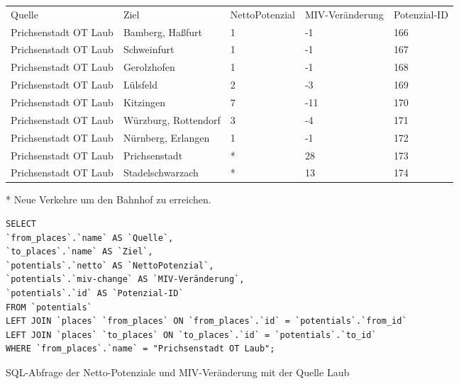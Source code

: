\begin{tabularx}{\textwidth}{*5{X}}
Quelle & Ziel & NettoPotenzial & MIV-Veränderung & Potenzial-ID\\ 
Prichsenstadt OT Laub & Bamberg, Haßfurt & 1 & -1 & 166\\ 
Prichsenstadt OT Laub & Schweinfurt & 1 & -1 & 167\\ 
Prichsenstadt OT Laub & Gerolzhofen & 1 & -1 & 168\\ 
Prichsenstadt OT Laub & Lülsfeld & 2 & -3 & 169\\ 
Prichsenstadt OT Laub & Kitzingen & 7 & -11 & 170\\ 
Prichsenstadt OT Laub & Würzburg, Rottendorf & 3 & -4 & 171\\ 
Prichsenstadt OT Laub & Nürnberg, Erlangen & 1 & -1 & 172\\ 
Prichsenstadt OT Laub & Prichsenstadt & * & 28 & 173\\ 
Prichsenstadt OT Laub & Stadelschwarzach & * & 13 & 174\\ 
\end{tabularx}    
\newline
\newline
* Neue Verkehre um den Bahnhof zu erreichen.
\newline
\begin{listing}[htbp]
\begin{verbatim}
SELECT
`from_places`.`name` AS `Quelle`, 
`to_places`.`name` AS `Ziel`, 
`potentials`.`netto` AS `NettoPotenzial`, 
`potentials`.`miv-change` AS `MIV-Veränderung`, 
`potentials`.`id` AS `Potenzial-ID`
FROM `potentials`
LEFT JOIN `places` `from_places` ON `from_places`.`id` = `potentials`.`from_id`
LEFT JOIN `places` `to_places` ON `to_places`.`id` = `potentials`.`to_id`
WHERE `from_places`.`name` = "Prichsenstadt OT Laub";
\end{verbatim}
\caption{SQL-Abfrage der Netto-Potenziale und MIV-Veränderung mit der Quelle Laub}\label{lst-fz-laub}
\end{listing}